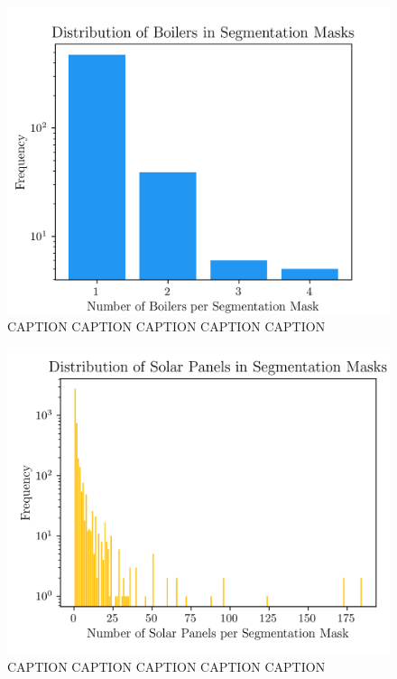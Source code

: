 \documentclass[conference]{IEEEtran}
\begin{document}
\begin{figure}[H]
    \centering
    \includegraphics[width=1\linewidth]{assets/data_boil_distribution.png}
    \caption{CAPTION CAPTION CAPTION CAPTION CAPTION}
    \label{fig:data_boil_distribution}
\end{figure}

\begin{figure}[H]
    \centering
    \includegraphics[width=1\linewidth]{assets/data_panel_distribution.png}
    \caption{CAPTION CAPTION CAPTION CAPTION CAPTION}
    \label{fig:data_panel_distribution}
\end{figure}
\end{document}
